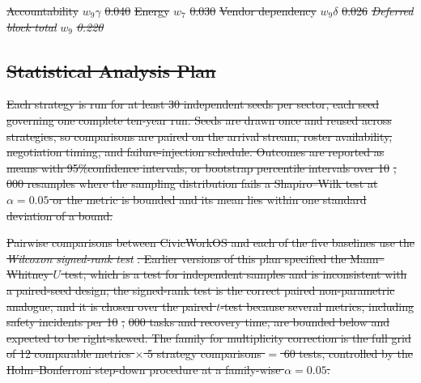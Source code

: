 \documentclass[utf8]{FrontiersinHarvard}
\providecommand{\DIFdel}[1]{{\protect\color{red}\sout{#1}}}                      %
\providecommand{\DIFdelFL}[1]{\DIFdel{#1}} %
\begin{document}
\DIFdelFL{Accountability }%
\DIFdelFL{$w_9\gamma$ }%
\DIFdelFL{0.040}%
\DIFdelFL{Energy }%
\DIFdelFL{$w_7$ }%
\DIFdelFL{0.030}%
\DIFdelFL{Vendor dependency }%
\DIFdelFL{$w_9\delta$ }%
\DIFdelFL{0.026}%
\textit{\DIFdelFL{Deferred block total}} %
\DIFdelFL{$w_9$ }%
\textit{\DIFdelFL{0.220}}%

\subsection{\DIFdel{Statistical Analysis Plan}}
\addtocounter{subsection}{-1}%

\DIFdel{Each strategy is run for at least 30 independent seeds per sector, each seed governing one complete ten-year run. Seeds are drawn once and reused across strategies, so comparisons are paired on the arrival stream, roster availability, negotiation timing, and failure-injection schedule. Outcomes are reported as means with 95\%confidence intervals, or bootstrap percentile intervals over 10}%
\DIFdel{,}%
\DIFdel{000 resamples where the sampling distribution fails a Shapiro--Wilk test at $\alpha=0.05$ or the metric is bounded and its mean lies within one standard deviation of a bound.
	}%

\DIFdel{Pairwise comparisons between CivicWorkOS and each of the five baselines use the }\textit{\DIFdel{Wilcoxon signed-rank test}}%
\DIFdel{. Earlier versions of this plan specified the Mann--Whitney $U$ test, which is a test for independent samples and is inconsistent with a paired-seed design; the signed-rank test is the correct paired non-parametric analogue, and it is chosen over the paired $t$-test because several metrics, including safety incidents per 10}%
\DIFdel{,}%
\DIFdel{000 tasks and recovery time, are bounded below and expected to be right-skewed. The family for multiplicity correction is the full grid of 12 comparable metrics $\times$ 5 strategy comparisons $=$ 60 tests, controlled by the Holm--Bonferroni step-down procedure at a family-wise $\alpha=0.05$.
	}%
\end{document}
